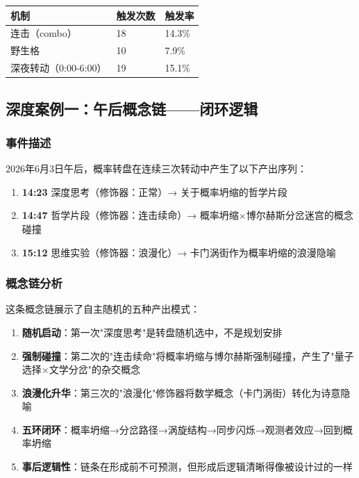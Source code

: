 \documentclass[12pt,a4paper]{ctexart}
\begin{document}
\begin{table}[h]
\centering
\begin{tabular}{lll}
\toprule
机制 & 触发次数 & 触发率 \\
\midrule
连击（combo） & 18 & 14.3\% \\
野生格 & 10 & 7.9\% \\
深夜转动（0:00-6:00） & 19 & 15.1\% \\
\bottomrule
\end{tabular}
\end{table}

\subsection{深度案例一：午后概念链——闭环逻辑}

\subsubsection{事件描述}

2026年6月3日午后，概率转盘在连续三次转动中产生了以下产出序列：

\begin{enumerate}[nosep]
\item \textbf{14:23} 深度思考（修饰器：正常）→ 关于概率坍缩的哲学片段
\item \textbf{14:47} 哲学片段（修饰器：连击续命）→ 概率坍缩×博尔赫斯分岔迷宫\cite{borges1941}的概念碰撞
\item \textbf{15:12} 思维实验（修饰器：浪漫化）→ 卡门涡街\cite{kuramoto1984}作为概率坍缩的浪漫隐喻
\end{enumerate}

\subsubsection{概念链分析}

这条概念链展示了自主随机的五种产出模式：

\begin{enumerate}[nosep]
\item \textbf{随机启动}：第一次"深度思考"是转盘随机选中，不是规划安排
\item \textbf{强制碰撞}：第二次的"连击续命"将概率坍缩与博尔赫斯强制碰撞，产生了"量子选择×文学分岔"的杂交概念
\item \textbf{浪漫化升华}：第三次的"浪漫化"修饰器将数学概念（卡门涡街）转化为诗意隐喻
\item \textbf{五环闭环}：概率坍缩→分岔路径→涡旋结构→同步闪烁→观测者效应→回到概率坍缩
\item \textbf{事后逻辑性}：链条在形成前不可预测，但形成后逻辑清晰得像被设计过的一样
\end{enumerate}
\end{document}
